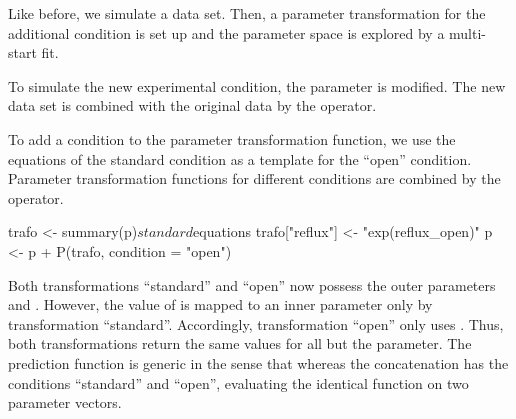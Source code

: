 \documentclass[article]{jss}
\begin{document}
Like before, we simulate a data set. Then, a parameter transformation for the additional condition is set up and the parameter space is explored by a multi-start fit.

To simulate the new experimental condition, the  parameter is modified. The new data set is combined with the original data by the  operator.

\begin{CodeChunk}
\end{CodeChunk}

To add a condition to the parameter transformation function, we use the equations of the standard condition as a template for the ``open'' condition. Parameter transformation functions for different conditions are combined by the  operator.

\begin{CodeChunk}
\begin{CodeInput}
trafo <- summary(p)$standard$equations
trafo["reflux"] <- "exp(reflux_open)"
p <- p + P(trafo, condition = "open")
\end{CodeInput}
\end{CodeChunk}

Both transformations ``standard'' and ``open'' now possess the outer parameters  and . However, the value of  is mapped to an inner parameter only by transformation ``standard''. Accordingly, transformation ``open'' only uses . 
Thus, both transformations return the same values for all but the  parameter. The prediction function  is generic in the sense that  whereas the concatenation  has the conditions ``standard'' and ``open'', evaluating the identical function  on two parameter vectors.
\end{document}
